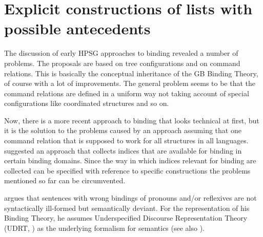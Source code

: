 \documentclass[output=paper
	        ,collection
	        ,collectionchapter
 	        ,biblatex
                ,babelshorthands
                ,newtxmath
                ,draftmode
                ,colorlinks, citecolor=brown
]{langscibook}
\begin{document}
\section{Explicit constructions of lists with possible antecedents}
\label{sec-bt-nonlocal}

The discussion of early HPSG approaches to binding revealed a number of problems. The proposals are
based on tree configurations and on command relations. This is basically the conceptual inheritance
of the GB Binding Theory, of course with a lot of improvements. The general problem seems to be that
the command relations are defined in a uniform way not taking account of special configurations like
coordinated structures and so on.

Now, there is a more recent approach to binding that looks technical at first, but it is the
solution to the problems caused by an approach assuming that one command relation that is supposed
to work for all structures in all languages. \citet{Branco2002a} suggested an approach that collects
indices that are available for binding in certain binding domains. Since the way in which indices
relevant for binding are collected can be specified with reference to specific constructions the
problems mentioned so far can be circumvented. 

\citet{Branco2002a} argues that sentences with wrong bindings of pronouns and/or reflexives are not
syntactically ill-formed but semantically deviant. For the representation of his Binding Theory, he
assumes Underspecified Discourse Representation Theory (UDRT, \citealp{Reyle93b-u,FR95a-u}) as the
underlying formalism for semantics (see also
). 
\end{document}
